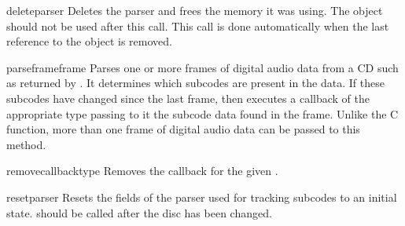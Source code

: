 \begin{funcdesc}{deleteparser}{}
Deletes the parser and frees the memory it was using.  The object
should not be used after this call.  This call is done automatically
when the last reference to the object is removed.
\end{funcdesc}

\begin{funcdesc}{parseframe}{frame}
Parses one or more frames of digital audio data from a CD such as
returned by .  It determines which subcodes are present
in the data.  If these subcodes have changed since the last frame,
then  executes a callback of the appropriate type
passing to it the subcode data found in the frame.
Unlike the C function, more than one frame of digital audio data can
be passed to this method.
\end{funcdesc}

\begin{funcdesc}{removecallback}{type}
Removes the callback for the given .
\end{funcdesc}

\begin{funcdesc}{resetparser}{}
Resets the fields of the parser used for tracking subcodes to an
initial state.   should be called after the disc has
been changed.
\end{funcdesc}
